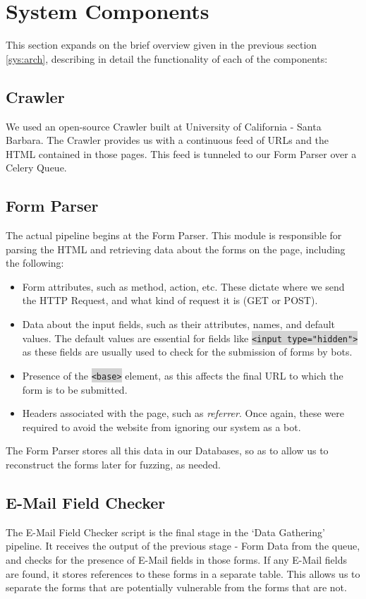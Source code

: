 \section{System Components}
\label{Comp}

This section expands on the brief overview given in the previous section \ref{sys:arch}, describing in detail the functionality of each of the components:

\subsection{Crawler}
	\label{Comp:Crawler}
	We used an open-source Crawler built at University of California - Santa Barbara. The Crawler provides us with a continuous feed of URLs and the HTML contained in those pages. This feed is tunneled to our Form Parser over a Celery Queue.
	
\subsection{Form Parser}
	\label{Comp:FP}
	The actual pipeline begins at the Form Parser. This module is responsible for parsing the HTML and retrieving data about the forms on the page, including the following:
	\begin{itemize}
		\item Form attributes, such as method, action, etc. These dictate where we send the HTTP Request, and what kind of request it is (GET or POST).
		\item Data about the input fields, such as their attributes, names, and default values. The default values are essential for fields like \colorbox{lightgray}{\lstinline{<input type="hidden">}} as these fields are usually used to check for the submission of forms by bots.
		\item Presence of the \colorbox{lightgray}{\lstinline{<base>}} element, as this affects the final URL to which the form is to be submitted.
		\item Headers associated with the page, such as \emph{referrer}. Once again, these were required to avoid the website from ignoring our system as a bot.
	\end{itemize} 
	The Form Parser stores all this data in our Databases, so as to allow us to reconstruct the forms later for fuzzing, as needed.

\subsection{E-Mail Field Checker}
	\label{Comp:EMFC}
	The E-Mail Field  Checker script is the final stage in the `Data Gathering' pipeline. It receives the output of the previous stage - Form Data from the queue, and checks for the presence of E-Mail fields in those forms. If any E-Mail fields are found, it stores references to these forms in a separate table. This allows us to separate the forms that are potentially vulnerable from the forms that are not.

